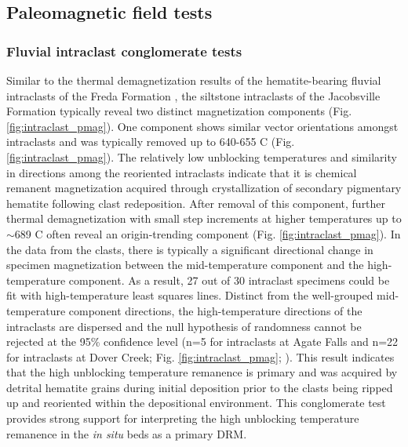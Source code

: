 \documentclass[draft]{agujournal2019}
\begin{document}
\subsection*{Paleomagnetic field tests}

\subsubsection*{Fluvial intraclast conglomerate tests}

Similar to the thermal demagnetization results of the hematite-bearing fluvial intraclasts of the Freda Formation \cite{Swanson-Hysell2019b}, the siltstone intraclasts of the Jacobsville Formation typically reveal two distinct magnetization components (Fig. \ref{fig:intraclast_pmag}). One component shows similar vector orientations amongst intraclasts and was typically removed up to 640-655 \textdegree C (Fig. \ref{fig:intraclast_pmag}). The relatively low unblocking temperatures and similarity in directions among the reoriented intraclasts indicate that it is chemical remanent magnetization acquired through crystallization of secondary pigmentary hematite following clast redeposition. After removal of this component, further thermal demagnetization with small step increments at higher temperatures up to $\sim$689 \textdegree C often reveal an origin-trending component (Fig. \ref{fig:intraclast_pmag}). In the data from the clasts, there is typically a significant directional change in specimen magnetization between the mid-temperature component and the high-temperature component. As a result, 27 out of 30 intraclast specimens could be fit with high-temperature least squares lines. Distinct from the well-grouped mid-temperature component directions, the high-temperature directions of the intraclasts are dispersed and the null hypothesis of randomness cannot be rejected at the 95\% confidence level (n=5 for intraclasts at Agate Falls and n=22 for intraclasts at Dover Creek; Fig. \ref{fig:intraclast_pmag}; ). This result indicates that the high unblocking temperature remanence is primary and was acquired by detrital hematite grains during initial deposition prior to the clasts being ripped up and reoriented within the depositional environment. This conglomerate test provides strong support for interpreting the high unblocking temperature remanence in the \textit{in situ} beds as a primary DRM. 
\end{document}
